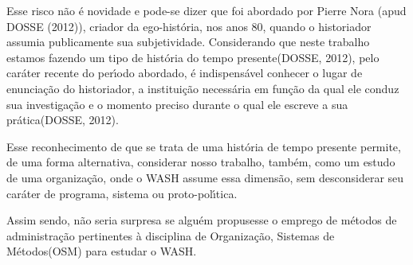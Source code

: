 \documentclass[
12pt,		%
openright,	%
twoside,  %
a4paper,			%
chapter=TITLE,		%
english,			%
french,				%
spanish,			%
brazil				%
]{USPSC-classe/USPSC}
\begin{document}
\noindent\begin{center}\mbox{\centering{}}\end{center}


Esse risco n\~ao \'e novidade e pode-se dizer que foi abordado por Pierre Nora  (apud DOSSE (2012)), criador da ego-hist\'oria, nos anos 80, quando o historiador assumia publicamente sua subjetividade. Considerando que neste trabalho estamos fazendo um tipo de \textquotedbl hist\'oria do tempo presente\textquotedbl   (DOSSE, 2012), pelo car\'ater recente do per\'{\i}odo abordado, \'e indispens\'avel \textquotedbl conhecer o lugar de enuncia\c{c}\~ao do historiador, a institui\c{c}\~ao necess\'aria em fun\c{c}\~ao da qual ele conduz sua investiga\c{c}\~ao e o momento preciso durante o qual ele escreve a sua pr\'atica\textquotedbl   (DOSSE, 2012).

















Esse reconhecimento de que se trata de uma hist\'oria de tempo presente permite, de uma forma alternativa, considerar nosso trabalho, tamb\'em, como um estudo de uma organiza\c{c}\~ao, onde o WASH assume essa dimens\~ao, sem desconsiderar seu car\'ater de  programa, sistema ou proto-pol\'{\i}tica.

















Assim sendo, n\~ao seria surpresa se algu\'em propusesse o emprego de m\'etodos de administra\c{c}\~ao pertinentes \`a disciplina de \textquotedbl Organiza\c{c}\~ao, Sistemas de M\'etodos\textquotedbl  (OSM) para estudar o WASH.
\end{document}
